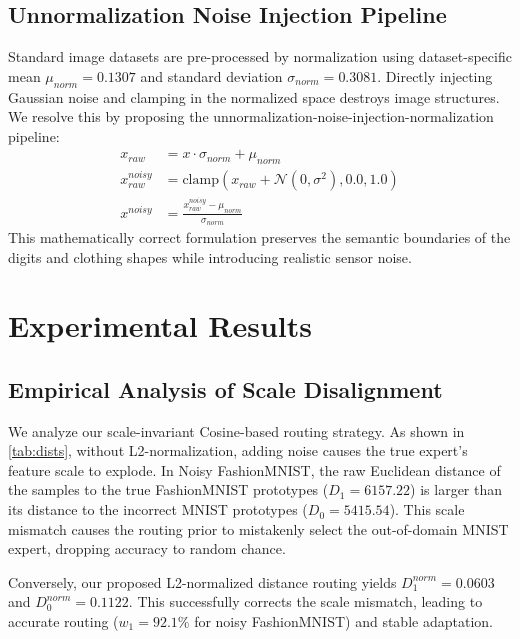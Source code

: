\documentclass{article}
\begin{document}
\subsection{Unnormalization Noise Injection Pipeline}
Standard image datasets are pre-processed by normalization using dataset-specific mean $\mu_{norm} = 0.1307$ and standard deviation $\sigma_{norm} = 0.3081$. Directly injecting Gaussian noise and clamping in the normalized space destroys image structures. We resolve this by proposing the unnormalization-noise-injection-normalization pipeline:
\begin{align}
    x_{raw} &= x \cdot \sigma_{norm} + \mu_{norm} \\
    x_{raw}^{noisy} &= \text{clamp}(x_{raw} + \mathcal{N}(0, \sigma^2), 0.0, 1.0) \\
    x^{noisy} &= \frac{x_{raw}^{noisy} - \mu_{norm}}{\sigma_{norm}}
\end{align}
This mathematically correct formulation preserves the semantic boundaries of the digits and clothing shapes while introducing realistic sensor noise.

\section{Experimental Results}
\label{sec:results}

\subsection{Empirical Analysis of Scale Disalignment}
We analyze our scale-invariant Cosine-based routing strategy. As shown in \cref{tab:dists}, without L2-normalization, adding noise causes the true expert's feature scale to explode. In Noisy FashionMNIST, the raw Euclidean distance of the samples to the true FashionMNIST prototypes ($D_1 = 6157.22$) is larger than its distance to the incorrect MNIST prototypes ($D_0 = 5415.54$). This scale mismatch causes the routing prior to mistakenly select the out-of-domain MNIST expert, dropping accuracy to random chance.

Conversely, our proposed L2-normalized distance routing yields $D_1^{norm} = 0.0603$ and $D_0^{norm} = 0.1122$. This successfully corrects the scale mismatch, leading to accurate routing ($w_1 = 92.1\%$ for noisy FashionMNIST) and stable adaptation.
\end{document}
